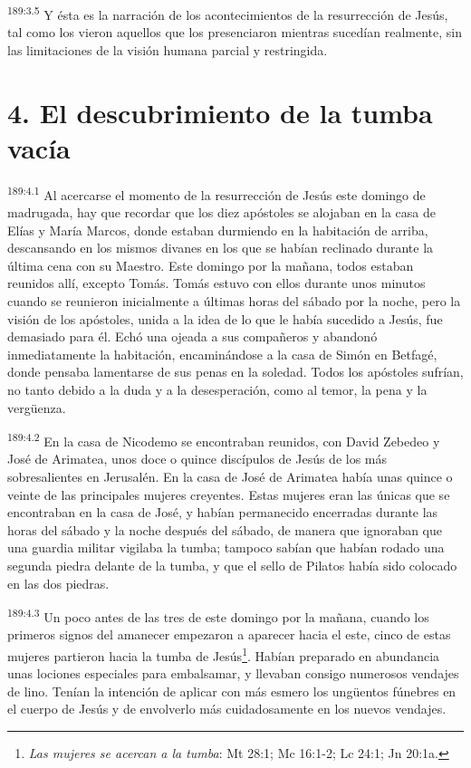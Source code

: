 \par 
\textsuperscript{189:3.5} Y ésta es la narración de los acontecimientos de la resurrección de Jesús, tal como los vieron aquellos que los presenciaron mientras sucedían realmente, sin las limitaciones de la visión humana parcial y restringida.

\section*{4. El descubrimiento de la tumba vacía}
\par 
\textsuperscript{189:4.1} Al acercarse el momento de la resurrección de Jesús este domingo de madrugada, hay que recordar que los diez apóstoles se alojaban en la casa de Elías y María Marcos, donde estaban durmiendo en la habitación de arriba, descansando en los mismos divanes en los que se habían reclinado durante la última cena con su Maestro. Este domingo por la mañana, todos estaban reunidos allí, excepto Tomás. Tomás estuvo con ellos durante unos minutos cuando se reunieron inicialmente a últimas horas del sábado por la noche, pero la visión de los apóstoles, unida a la idea de lo que le había sucedido a Jesús, fue demasiado para él. Echó una ojeada a sus compañeros y abandonó inmediatamente la habitación, encaminándose a la casa de Simón en Betfagé, donde pensaba lamentarse de sus penas en la soledad. Todos los apóstoles sufrían, no tanto debido a la duda y a la desesperación, como al temor, la pena y la verg\"uenza.

\par 
\textsuperscript{189:4.2} En la casa de Nicodemo se encontraban reunidos, con David Zebedeo y José de Arimatea, unos doce o quince discípulos de Jesús de los más sobresalientes en Jerusalén. En la casa de José de Arimatea había unas quince o veinte de las principales mujeres creyentes. Estas mujeres eran las únicas que se encontraban en la casa de José, y habían permanecido encerradas durante las horas del sábado y la noche después del sábado, de manera que ignoraban que una guardia militar vigilaba la tumba; tampoco sabían que habían rodado una segunda piedra delante de la tumba, y que el sello de Pilatos había sido colocado en las dos piedras.

\par 
\textsuperscript{189:4.3} Un poco antes de las tres de este domingo por la mañana, cuando los primeros signos del amanecer empezaron a aparecer hacia el este, cinco de estas mujeres partieron hacia la tumba de Jesús\footnote{\textit{Las mujeres se acercan a la tumba}: Mt 28:1; Mc 16:1-2; Lc 24:1; Jn 20:1a.}. Habían preparado en abundancia unas lociones especiales para embalsamar, y llevaban consigo numerosos vendajes de lino. Tenían la intención de aplicar con más esmero los ung\"uentos fúnebres en el cuerpo de Jesús y de envolverlo más cuidadosamente en los nuevos vendajes.

